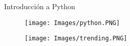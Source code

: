 \begin{frame}[t]{Introducción a Python}\vspace{10pt}

\begin{figure}
	\texttt{[image: Images/python.PNG]}
\end{figure}

\begin{figure}
\texttt{[image: Images/trending.PNG]}
\end{figure}

\end{frame}